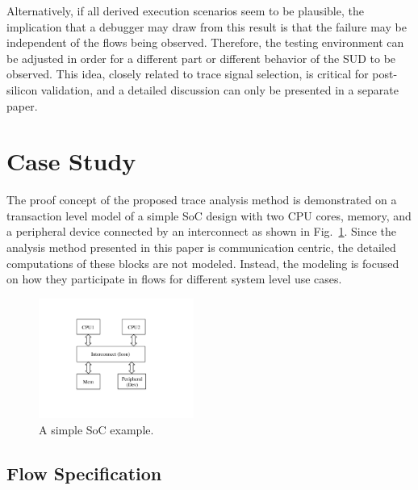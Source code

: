 \documentclass[conference]{IEEEtran}
\begin{document}
Alternatively, if all derived execution scenarios seem to be plausible, the implication that a debugger may draw from this result is that the failure may be independent of the flows being observed.  Therefore, the testing environment can be adjusted in order for a different part or different behavior of the SUD to be observed.  This idea, closely related to trace signal selection, is critical for post-silicon validation, and a detailed discussion can only be presented in a separate paper. 


  

\section{Case Study}

The proof concept of the proposed trace analysis method is demonstrated on a transaction level model of a simple SoC design with two CPU cores, memory, and a peripheral device connected by an interconnect as shown in Fig.~\ref{fig-SoC-ex}.  Since the analysis method presented in this paper is communication centric, the detailed computations of these blocks are not modeled.  Instead, the modeling is focused on how they participate in flows for different system level use cases.

\begin{figure}[tb]
\begin{center}
\includegraphics[width=2in]{figures/simple-ex}
\caption{A simple SoC example.}
\label{fig-SoC-ex}
\end{center}
\end{figure}


\subsection{Flow Specification}
\end{document}
